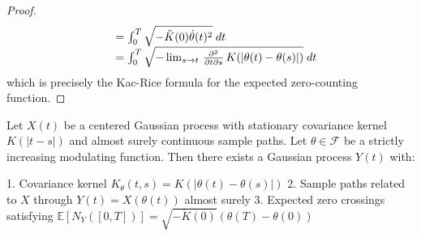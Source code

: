 \documentclass{mc}
\begin{document}
\begin{proof}
\begin{equation}
\begin{array}{ll}
      & = \int_0^T \sqrt{- \ddot{K} (0) \dot{\theta} (t)^2}  \hspace{0.27em}
      dt\\
      & = \int_0^T \sqrt{- \lim_{s \to t}  \hspace{0.17em}
      \frac{\partial^2}{\partial t \partial s}  \hspace{0.17em} K (| \theta
      (t) - \theta (s) |)}  \hspace{0.27em} dt
    \end{array}
  \end{equation}
  which is precisely the Kac-Rice formula for the expected zero-counting
  function.
\end{proof}

\begin{theorem}
Let $X(t)$ be a centered Gaussian process with stationary covariance kernel $K(|t-s|)$ and almost surely continuous sample paths. Let $\theta \in \mathcal{F}$ be a strictly increasing modulating function. Then there exists a Gaussian process $Y(t)$ with:

1. Covariance kernel $K_\theta(t,s) = K(|\theta(t)-\theta(s)|)$
2. Sample paths related to $X$ through $Y(t) = X(\theta(t))$ almost surely
3. Expected zero crossings satisfying $\mathbb{E}[N_Y([0,T])] = \sqrt{-\ddot{K}(0)}(\theta(T)-\theta(0))$
\end{theorem}
\end{document}
